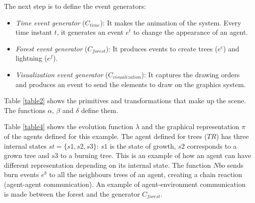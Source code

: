 \documentclass[runningheads]{llncs}
\begin{document}
The next step is to define the event generators:

\begin{itemize}
    \item \textit{Time event generator} ($C_{time}$): It makes the animation of the system. Every time
    instant $t$, it generates an event $e^t$ to change the appearance of an agent.

    \item \textit{Forest event generator} ($C_{forest}$): It produces events to create trees ($e^{c}$)
    and lightning ($e^{f}$).

    \item \textit{Visualization event generator} ($C_{visualization}$): It captures the drawing orders and produces an
    event to send the elements to draw on the graphics system.
\end{itemize}


Table \ref{table2} shows the primitives and transformations that make up the scene.
The functions ${\alpha}$, ${\beta}$ and ${\delta}$ define them.

Table \ref{table4} shows the evolution function $\lambda$ and the graphical representation $\pi$
of the agents defined for this example. The agent defined for trees ($TR$) has three internal
states $st = \{s1, s2, s3 \}$: $s1$ is the state of growth, $s2$ corresponds to a grown tree and $s3$ to a burning tree.
This is an example of how an agent can have different representation depending on its internal state.
The function $Nbo$ sends burn events $e^b$ to all the neighbours trees of an agent, creating
a chain reaction (agent-agent communication). An example of agent-environment communication is made
between the forest and the generator $C_{forest}$.

\vspace{-0.4cm}
\end{document}
